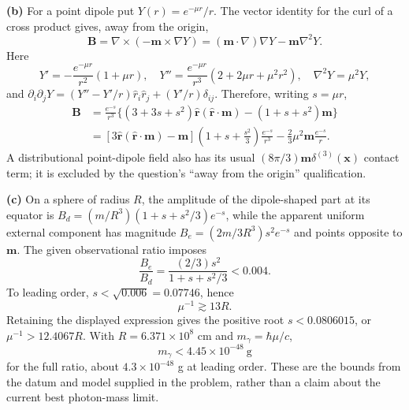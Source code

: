 \medskip\noindent\textbf{(b)} For a point dipole put $Y(r)=e^{-\mu r}/r$.  The vector identity
for the curl of a cross product gives, away from the origin,
\[
\mathbf B=\nabla\times(-\mathbf m\times\nabla Y)
=(\mathbf m\cdot\nabla)\nabla Y-\mathbf m\nabla^2Y.
\]
Here
\[
Y'=-\frac{e^{-\mu r}}{r^2}(1+\mu r),\quad
Y''=\frac{e^{-\mu r}}{r^3}(2+2\mu r+\mu^2r^2),\quad
\nabla^2Y=\mu^2Y,
\]
and
$\partial_i\partial_jY=(Y''-Y'/r)\hat r_i\hat r_j+(Y'/r)\delta_{ij}$.
Therefore, writing $s=\mu r$,
\begin{align*}
\mathbf B&=\frac{e^{-s}}{r^3}
 \{(3+3s+s^2)\hat{\mathbf r}(\hat{\mathbf r}\cdot\mathbf m)
 -(1+s+s^2)\mathbf m\}\\
&=\boxed{[3\hat{\mathbf r}(\hat{\mathbf r}\cdot\mathbf m)-\mathbf m]
 \left(1+s+\frac{s^2}3\right)\frac{e^{-s}}{r^3}
 -\frac23\mu^2\mathbf m\frac{e^{-s}}r.}
\end{align*}
A distributional point-dipole field also has its usual
$(8\pi/3)\mathbf m\delta^{(3)}(\mathbf x)$ contact term; it is
excluded by the question's ``away from the origin'' qualification.

\medskip\noindent\textbf{(c)} On a sphere of radius $R$, the amplitude of the dipole-shaped
part at its equator is
$B_d=(m/R^3)(1+s+s^2/3)e^{-s}$, while the apparent uniform
external component has magnitude
$B_e=(2m/3R^3)s^2e^{-s}$ and points opposite to $\mathbf m$.
The given observational ratio imposes
\[
\frac{B_e}{B_d}=\frac{(2/3)s^2}{1+s+s^2/3}<0.004.
\]
To leading order, $s<\sqrt{0.006}=0.07746$, hence
\[
\boxed{\mu^{-1}\gtrsim13R.}
\]
Retaining the displayed expression gives the positive root
$s<0.0806015$, or $\mu^{-1}>12.4067R$.
With $R=6.371\times10^8$ cm and $m_\gamma=\hbar\mu/c$,
\[
\boxed{m_\gamma<4.45\times10^{-48}\ \mathrm{g}}
\]
for the full ratio, about $4.3\times10^{-48}$ g at leading order.
These are the bounds from the datum and model supplied in the
problem, rather than a claim about the current best photon-mass limit.

